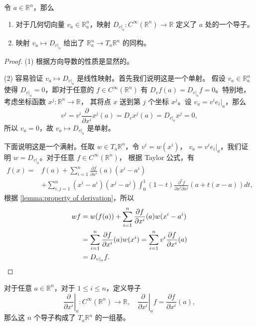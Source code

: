 \documentclass[fontset=none]{Notes}
\begin{document}
\begin{proposition}\label{prop:gemotry tangent vector is derivation}
  令 $a\in\mathbb{R}^n$，那么
  \begin{enumerate}
    \item 对于几何切向量 $v_a\in \mathbb{R}_a^n$，映射 $D_{v|_a}:C^\infty(\mathbb{R}^n)\to\mathbb{R}$
    定义了 $a$ 处的一个导子。
    \item 映射 $v_a\mapsto D_{v|_a}$ 给出了 $\mathbb{R}_a^n\to T_a\mathbb{R}^n$ 的同构。
  \end{enumerate}
\end{proposition}
\begin{proof}
  (1) 根据方向导数的性质是显然的。

  (2) 容易验证 $v_a\mapsto D_{v|_a}$ 是线性映射。首先我们说明这是一个单射。
  假设 $v_a\in\mathbb{R}_a^n$ 使得 $D_{v|_a}=0$，即对于任意的 $f\in C^\infty(\mathbb{R}^n)$
  有 $D_vf(a)=D_{v|_a}f=0$。特别地，考虑坐标函数 $x^j:\mathbb{R}^n\to\mathbb{R}$，
  其将点 $x$ 送到第 $j$ 个坐标 $x^j$。设 $v_a=v^i e_i|_a$，那么
  \[
    v^j=v^i\frac{\partial}{\partial x^i}x^j(a)=D_v x^j(a)=D_{v|_a}x^j=  0,
  \]
  所以 $v_a=0$，故 $v_a\mapsto D_{v|_a}$ 是单射。

  下面说明这是一个满射。任取 $w\in T_a\mathbb{R}^n$，令 $v^i=w(x^i)$，
  $v_a=v^ie_i|_a$，我们证明 $w=D_{v|_a}$。对于任意 $f\in C^\infty(\mathbb{R}^n)$，
  根据 Taylor 公式，有
  \begin{align*}
    f(x)={}&f(a)+\sum_{i=1}^n\frac{\partial f}{\partial x^i}(a)(x^i-a^i)\\
    &+\sum_{i,j=1}^n(x^i-a^i)(x^j-a^j)\int_0^1(1-t)\frac{\partial^2 f}{\partial x^i\partial x^j}
    (a+t(x-a))dt,
  \end{align*}
  根据 \autoref{lemma:property of derivation}，所以
  \begin{align*}
    wf&=w(f(a))+\sum_{i=1}^n\frac{\partial f}{\partial x^i}(a)w(x^i-a^i)\\
    &=\sum_{i=1}^n\frac{\partial f}{\partial x^i}(a)w(x^i)=\sum_{i=1}^nv^i
    \frac{\partial f}{\partial x^i}(a)\\
    &=D_{v|_a}f.\qedhere
  \end{align*}
\end{proof}

\begin{corollary}\label{coro:bases of geometry tangent space}
  对于任意 $a\in\mathbb{R}^n$，对于 $1\leq i\leq n$，定义导子
  \[
    \left.\frac{\partial}{\partial x^i}\right|_a:C^\infty(\mathbb{R}^n)\to\mathbb{R},\quad
    \left.\frac{\partial}{\partial x^i}\right|_af=\frac{\partial f}{\partial x^i}(a),
  \]
  那么这 $n$ 个导子构成了 $T_a\mathbb{R}^n$ 的一组基。
\end{corollary}
\end{document}
